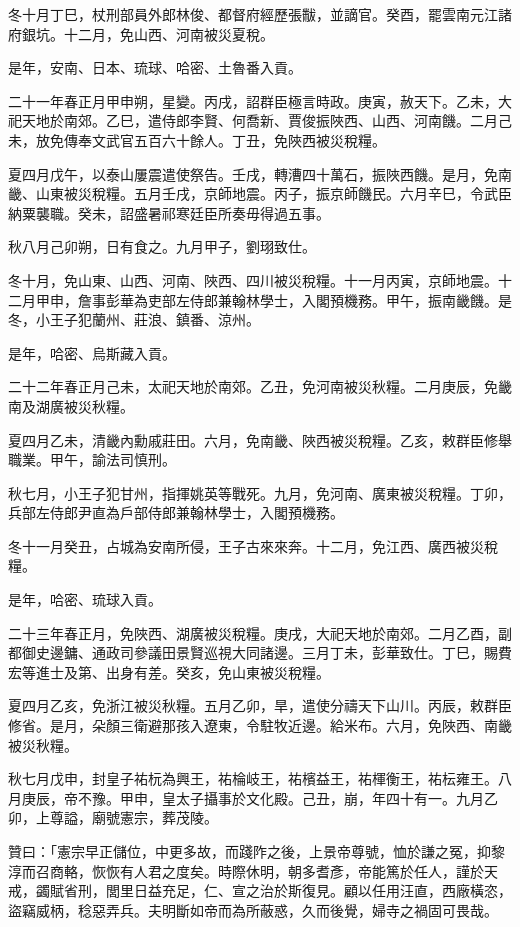 \begin{pinyinscope}
冬十月丁巳，杖刑部員外郎林俊、都督府經歷張黻，並謫官。癸酉，罷雲南元江諸府銀坑。十二月，免山西、河南被災夏稅。

是年，安南、日本、琉球、哈密、土魯番入貢。

二十一年春正月甲申朔，星變。丙戌，詔群臣極言時政。庚寅，赦天下。乙未，大祀天地於南郊。乙巳，遣侍郎李賢、何喬新、賈俊振陜西、山西、河南饑。二月己未，放免傳奉文武官五百六十餘人。丁丑，免陜西被災稅糧。

夏四月戊午，以泰山屢震遣使祭告。壬戌，轉漕四十萬石，振陜西饑。是月，免南畿、山東被災稅糧。五月壬戌，京師地震。丙子，振京師饑民。六月辛巳，令武臣納粟襲職。癸未，詔盛暑祁寒廷臣所奏毋得過五事。

秋八月己卯朔，日有食之。九月甲子，劉珝致仕。

冬十月，免山東、山西、河南、陜西、四川被災稅糧。十一月丙寅，京師地震。十二月甲申，詹事彭華為吏部左侍郎兼翰林學士，入閣預機務。甲午，振南畿饑。是冬，小王子犯蘭州、莊浪、鎮番、涼州。

是年，哈密、烏斯藏入貢。

二十二年春正月己未，太祀天地於南郊。乙丑，免河南被災秋糧。二月庚辰，免畿南及湖廣被災秋糧。

夏四月乙未，清畿內勳戚莊田。六月，免南畿、陜西被災稅糧。乙亥，敕群臣修舉職業。甲午，諭法司慎刑。

秋七月，小王子犯甘州，指揮姚英等戰死。九月，免河南、廣東被災稅糧。丁卯，兵部左侍郎尹直為戶部侍郎兼翰林學士，入閣預機務。

冬十一月癸丑，占城為安南所侵，王子古來來奔。十二月，免江西、廣西被災稅糧。

是年，哈密、琉球入貢。

二十三年春正月，免陜西、湖廣被災稅糧。庚戌，大祀天地於南郊。二月乙酉，副都御史邊鏞、通政司參議田景賢巡視大同諸邊。三月丁未，彭華致仕。丁巳，賜費宏等進士及第、出身有差。癸亥，免山東被災稅糧。

夏四月乙亥，免浙江被災秋糧。五月乙卯，旱，遣使分禱天下山川。丙辰，敕群臣修省。是月，朵顏三衛避那孩入遼東，令駐牧近邊。給米布。六月，免陜西、南畿被災秋糧。

秋七月戊申，封皇子祐杬為興王，祐棆岐王，祐檳益王，祐楎衡王，祐枟雍王。八月庚辰，帝不豫。甲申，皇太子攝事於文化殿。己丑，崩，年四十有一。九月乙卯，上尊謚，廟號憲宗，葬茂陵。

贊曰：「憲宗早正儲位，中更多故，而踐阼之後，上景帝尊號，恤於謙之冤，抑黎淳而召商輅，恢恢有人君之度矣。時際休明，朝多耆彥，帝能篤於任人，謹於天戒，蠲賦省刑，閭里日益充足，仁、宣之治於斯復見。顧以任用汪直，西廠橫恣，盜竊威柄，稔惡弄兵。夫明斷如帝而為所蔽惑，久而後覺，婦寺之禍固可畏哉。

\end{pinyinscope}